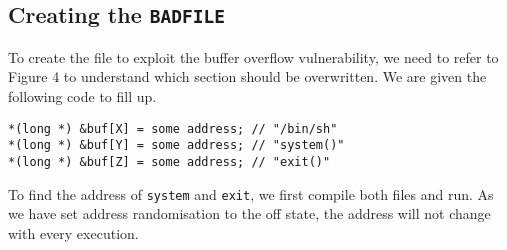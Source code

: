\documentclass[a4paper,12pt]{article}
\begin{document}
\subsection{Creating the \texttt{BADFILE}}
To create the file to exploit the buffer overflow vulnerability, we need to refer to Figure 4 to understand which section should be overwritten. We are given the following code to fill up.
\begin{verbatim}
*(long *) &buf[X] = some address; // "/bin/sh"
*(long *) &buf[Y] = some address; // "system()"
*(long *) &buf[Z] = some address; // "exit()"
\end{verbatim}
To find the address of \texttt{system} and \texttt{exit}, we first compile both files and run. As we have set address randomisation to the off state, the address will not change with every execution.
 
\end{document}

